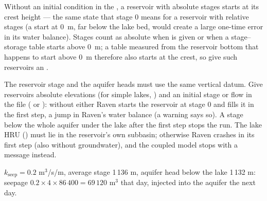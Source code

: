 Without an initial condition in the , a reservoir with absolute stages starts at its crest height --- the same state
that stage 0 means for a reservoir with relative stages (a start at 0~m, far below the lake bed, would create a large
one-time error in its water balance). Stages count as absolute when
 is given or when a stage--storage table starts above 0~m; a table measured from the
reservoir bottom that happens to start above 0~m therefore also starts at the crest, so give such reservoirs an
.
\begin{watch}
The reservoir stage and the aquifer heads must use the same vertical datum. Give reservoirs absolute elevations (for
simple lakes, ) and an initial stage or flow in the  file
( or ): without either Raven starts the reservoir at stage 0 and
fills it in the first step, a jump in Raven's water balance (a warning says so). A stage below the whole aquifer under
the lake after the first step stops the run. The lake HRU () must lie in the reservoir's own subbasin;
otherwise Raven crashes in its first step (also without groundwater), and the coupled model stops with a message
instead.
\end{watch}
\begin{example}
$k_{\mathrm{seep}}=0.2$ m$^3$/s/m, average stage 1\,136 m, aquifer head below the lake 1\,132 m: seepage
$0.2\times4\times86\,400=69\,120$ m$^3$ that day, injected into the aquifer the next day.
\end{example}

